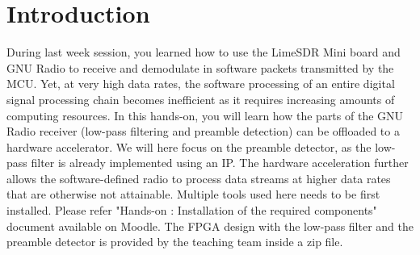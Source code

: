 \section*{Introduction}

During last week session, you learned how to use the LimeSDR Mini board and GNU Radio to receive and demodulate in software packets transmitted by the MCU. Yet, at very high data rates, the software processing of an entire digital signal processing chain becomes inefficient as it requires increasing amounts of computing resources. In this hands-on, you will learn how the parts of the GNU Radio receiver (low-pass filtering and preamble detection) can be offloaded to a hardware accelerator. We will here focus on the preamble detector, as the low-pass filter is already implemented using an IP. The hardware acceleration further allows the software-defined radio to process data streams at higher data rates that are otherwise not attainable. Multiple tools used here needs to be first installed. Please refer "Hands-on \handsOnN: Installation of the required components" document available on Moodle. The FPGA design with the low-pass filter and the preamble detector is provided by the teaching team inside a zip file.
